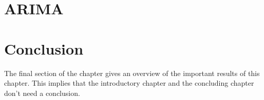 \section{ARIMA}


\section{Conclusion}
The final section of the chapter gives an overview of the important results
of this chapter. This implies that the introductory chapter and the
concluding chapter don't need a conclusion.





